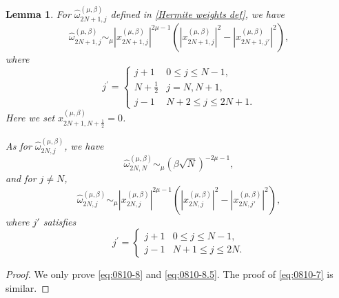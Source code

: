 \documentclass[pdflatex,sn-aps]{sn-jnl}%
\theoremstyle{thmstyleone}%
\newtheorem{lemma}{Lemma}[section]
\theoremstyle{thmstyletwo}%
\theoremstyle{thmstylethree}%
\begin{document}
\begin{appendices}
\begin{lemma}\label{lem:0810-3}
  For $\widehat{\omega}_{2N+1,j}^{(\mu,\beta)}$ defined in \eqref{Hermite weights def},
  we have
  \begin{equation}\label{eq:0810-7}
    \widehat{\omega}_{2 N+1, j}^{(\mu,\beta)} \sim_\mu\left|x^{(\mu,\beta)}_{2N+1,j}\right|^{2 \mu-1}\left(\left|x^{(\mu,\beta)}_{2N+1,j}\right|^2-\left|x^{(\mu,\beta)}_{2N+1,j'}\right|^2\right),
  \end{equation}
  where
  \begin{equation}\label{eq:0810-7.5}
    j^{\prime}= \begin{cases}j+1 & 0 \leqslant j \leqslant N-1, \\ N+\frac{1}{2} & j=N, N+1, \\ j-1 & N+2 \leqslant j \leqslant 2 N+1.\end{cases}
  \end{equation}
  Here we set $x^{(\mu,\beta)}_{2N+1,N+\frac{1}{2}} = 0$.

  As for $\widehat{\omega}^{(\mu,\beta)}_{2N,j}$, we have
  \begin{equation}\label{eq:0810-8}
    \widehat{\omega}_{2 N, N}^{(\mu,\beta)} \sim_\mu \left(\beta \sqrt{N}\right)^{-2\mu-1},
  \end{equation}
  and for $j \neq N$,
  \begin{equation}\label{eq:0810-8.5}
    \widehat{\omega}_{2 N, j}^{(\mu,\beta)} \sim_\mu\left|x^{(\mu,\beta)}_{2N,j}\right|^{2 \mu-1}\left(\left|x^{(\mu,\beta)}_{2N,j}\right|^2-\left|x^{(\mu,\beta)}_{2N,j'}\right|^2\right),
  \end{equation}
  where $j'$ satisfies
  \begin{equation}\label{eq:0810-8.75}
    j^{\prime}= \begin{cases}j+1 & 0 \leqslant j \leqslant N-1, \\ j-1 & N+1 \leqslant j \leqslant 2 N.\end{cases}
  \end{equation}
\end{lemma}
\begin{proof}
  We only prove \eqref{eq:0810-8} and \eqref{eq:0810-8.5}. The
  proof of \eqref{eq:0810-7} is similar.


\end{proof}
\end{appendices}
\end{document}
